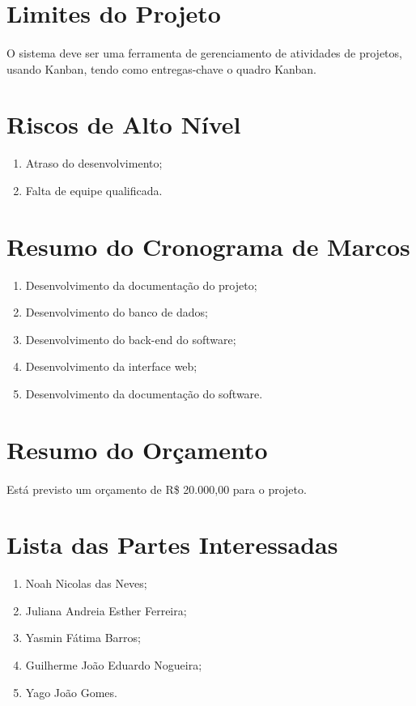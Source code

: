 \section{Limites do Projeto}
  \paragraph{}
    O sistema deve ser uma ferramenta de gerenciamento de atividades de projetos, usando Kanban, tendo como entregas-chave o quadro Kanban.

\section{Riscos de Alto Nível}
  \begin{enumerate}
    \item Atraso do desenvolvimento;
    \item Falta de equipe qualificada.
  \end{enumerate}

\section{Resumo do Cronograma de Marcos}
  \begin{enumerate}
    \item Desenvolvimento da documentação do projeto;
    \item Desenvolvimento do banco de dados;
    \item Desenvolvimento do back-end do software;
    \item Desenvolvimento da interface web;
    \item Desenvolvimento da documentação do software.
  \end{enumerate}

\section{Resumo do Orçamento}
  \paragraph{}
    Está previsto um orçamento de R\$ 20.000,00 para o projeto.

\section{Lista das Partes Interessadas}
  \begin{enumerate}
    \item Noah Nicolas das Neves;
    \item Juliana Andreia Esther Ferreira;
    \item Yasmin Fátima Barros;
    \item Guilherme João Eduardo Nogueira;
    \item Yago João Gomes.
  \end{enumerate}

